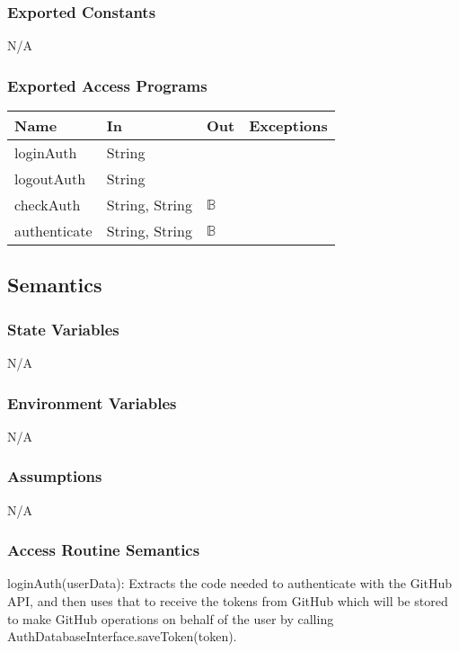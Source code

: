 \documentclass[12pt, titlepage]{article}
\begin{document}
	\subsubsection{Exported Constants}
	N/A
	
	\subsubsection{Exported Access Programs}
	
	\begin{center}
		\begin{tabular}{l  l  l  l}
			\hline
			\textbf{Name} & \textbf{In} & \textbf{Out} & \textbf{Exceptions} \\
			\hline
			loginAuth & String & ~ & ~ \\
			\hline
			logoutAuth & String & ~ & ~ \\
			\hline
			checkAuth & String, String & $\mathbb{B}$ & ~ \\
			\hline
			authenticate & String, String & $\mathbb{B}$ & ~ \\
			\hline
		\end{tabular}
	\end{center}
	
	
	\subsection{Semantics}
	
	\subsubsection{State Variables}
	N/A
	
	\subsubsection{Environment Variables}
	N/A
	
	\subsubsection{Assumptions}
	N/A
	
	\subsubsection{Access Routine Semantics}
	
	\noindent loginAuth(userData): Extracts the code needed to authenticate with the GitHub API, and then uses that to receive the tokens from GitHub which will be stored to make GitHub operations on behalf of the user by calling AuthDatabaseInterface.saveToken(token).  \\
	
\end{document}

